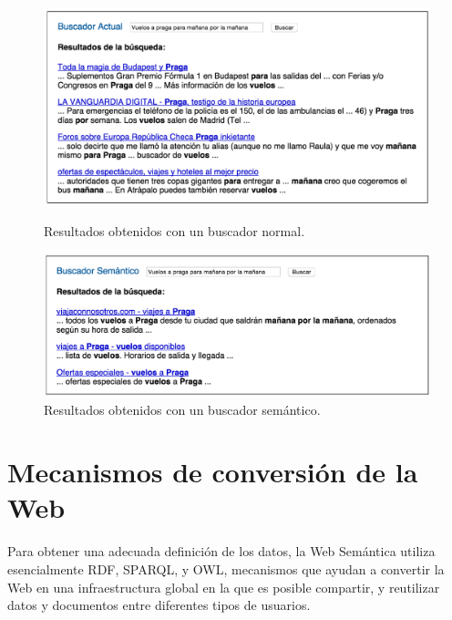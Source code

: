 \documentclass[10pt,a4paper]{article}
\begin{document}
\begin{figure}[H] %
\begin{center}
\includegraphics[width=400pt]{imgs/resultadoNormal}
\caption{Resultados obtenidos con un buscador normal.}
\includegraphics[width=400pt]{imgs/resultadoSemantico}
\caption{Resultados obtenidos con un buscador semántico.}
\end{center}
\end{figure}

\newpage
\section{Mecanismos de conversión de la Web}
Para obtener una adecuada definición de los datos, la Web Semántica utiliza esencialmente RDF, SPARQL, y OWL, mecanismos que ayudan a convertir la Web en una infraestructura global en la que es posible compartir, y reutilizar datos y documentos entre diferentes tipos de usuarios.
\end{document}
